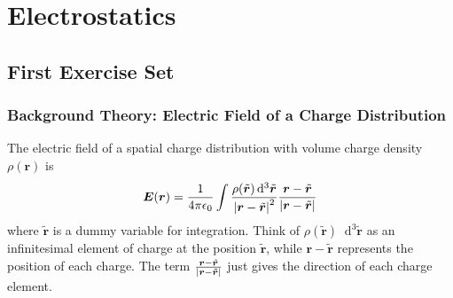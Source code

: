 \documentclass[11pt, a4paper]{article}
\newcommand{\diff}{\mathop{}\!\mathrm{d}} %
\renewcommand{\vec}[1]{\bm{#1}} %
\newcommand{\tvec}[1]{\tilde{\vec{#1}}} %
\renewcommand{\r}{\vec{r}}
\begin{document}
\tableofcontents

\newpage

\section{Electrostatics}

\subsection{First Exercise Set}

\subsubsection{Background Theory: Electric Field of a Charge Distribution}
The electric field of a spatial charge distribution with volume charge density $ \rho(\r) $ is
\begin{equation*}
	\vec{E}(\vec{r}) = \frac{1}{4\pi \epsilon_{0}}\int \frac{\rho(\tvec{r}) \diff^{3}\tvec{r} }{\abs{\vec{r} - \tvec{r}}^{2}} \frac{\vec{r} - \tvec{r}}{\abs{\vec{r} - \tvec{r}}}
\end{equation*}
where $ \tvec{r} $ is a dummy variable for integration. Think of $ \rho(\tvec{r}) \diff^{3}\tvec{r} $ as an infinitesimal element of charge at the position $ \tvec{r} $, while $ \vec{r} - \tvec{r} $ represents the position of each charge. The term $ \frac{\vec{r} - \tvec{r}}{\abs{\vec{r} - \tvec{r}}} $ just gives the direction of each charge element.
\end{document}
